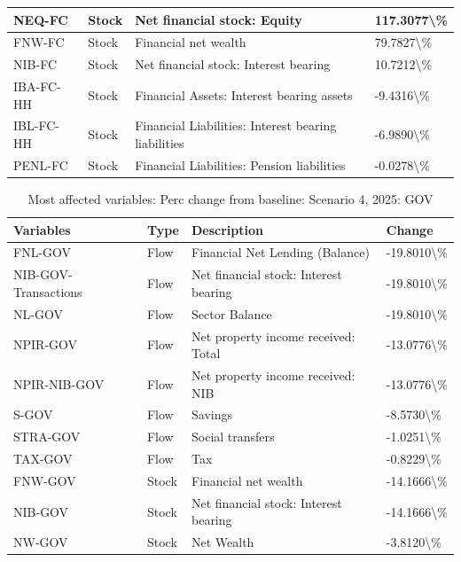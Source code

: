 \documentclass[
]{book}
\begin{document}
\begin{table}
\begin{tabular}[t]{l|l|l|l}
\hline
NEQ-FC & Stock & Net financial stock: Equity & 117.3077\textbackslash{}\%\\
\hline
FNW-FC & Stock & Financial net wealth & 79.7827\textbackslash{}\%\\
\hline
NIB-FC & Stock & Net financial stock: Interest bearing & 10.7212\textbackslash{}\%\\
\hline
IBA-FC-HH & Stock & Financial Assets: Interest bearing assets & -9.4316\textbackslash{}\%\\
\hline
IBL-FC-HH & Stock & Financial Liabilities: Interest bearing liabilities & -6.9890\textbackslash{}\%\\
\hline
PENL-FC & Stock & Financial Liabilities: Pension liabilities & -0.0278\textbackslash{}\%\\
\hline
\end{tabular}
\end{table}

\begin{table}

\caption{\label{tab:most-affected-Scenario-4-2025-perc-GOV}Most affected variables: Perc change from baseline: Scenario 4, 2025: GOV}
\centering
\fontsize{10}{12}\selectfont
\begin{tabular}[t]{l|l|l|l}
\hline
Variables & Type & Description & Change\\
\hline
FNL-GOV & Flow & Financial Net Lending (Balance) & -19.8010\textbackslash{}\%\\
\hline
NIB-GOV-Transactions & Flow & Net financial stock: Interest bearing & -19.8010\textbackslash{}\%\\
\hline
NL-GOV & Flow & Sector Balance & -19.8010\textbackslash{}\%\\
\hline
NPIR-GOV & Flow & Net property income received: Total & -13.0776\textbackslash{}\%\\
\hline
NPIR-NIB-GOV & Flow & Net property income received: NIB & -13.0776\textbackslash{}\%\\
\hline
S-GOV & Flow & Savings & -8.5730\textbackslash{}\%\\
\hline
STRA-GOV & Flow & Social transfers & -1.0251\textbackslash{}\%\\
\hline
TAX-GOV & Flow & Tax & -0.8229\textbackslash{}\%\\
\hline
FNW-GOV & Stock & Financial net wealth & -14.1666\textbackslash{}\%\\
\hline
NIB-GOV & Stock & Net financial stock: Interest bearing & -14.1666\textbackslash{}\%\\
\hline
NW-GOV & Stock & Net Wealth & -3.8120\textbackslash{}\%\\
\hline
\end{tabular}
\end{table}
\end{document}
